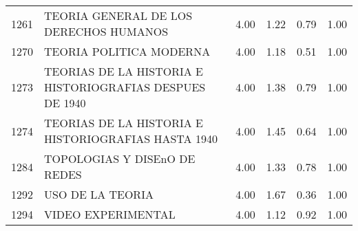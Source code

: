 \documentclass[12pt]{article}
\begin{document}
\begin{table}[ht]
\begin{tabular}{rlrrrr}
  1261 & TEORIA GENERAL DE LOS DERECHOS HUMANOS & 4.00 & 1.22 & 0.79 & 1.00 \\ 
  1270 & TEORIA POLITICA MODERNA & 4.00 & 1.18 & 0.51 & 1.00 \\ 
  1273 & TEORIAS DE LA HISTORIA E HISTORIOGRAFIAS DESPUES DE 1940 & 4.00 & 1.38 & 0.79 & 1.00 \\ 
  1274 & TEORIAS DE LA HISTORIA E HISTORIOGRAFIAS HASTA 1940 & 4.00 & 1.45 & 0.64 & 1.00 \\ 
  1284 & TOPOLOGIAS Y DISEnO DE REDES & 4.00 & 1.33 & 0.78 & 1.00 \\ 
  1292 & USO DE LA TEORIA & 4.00 & 1.67 & 0.36 & 1.00 \\ 
  1294 & VIDEO EXPERIMENTAL & 4.00 & 1.12 & 0.92 & 1.00 \\ 
   \hline
\end{tabular}
\end{table}
\end{document}
